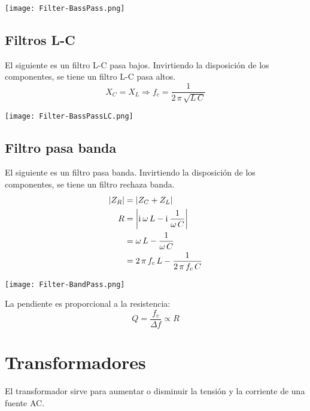\documentclass[a5paper,12pt,twoside]{book}
\begin{document}
\begin{center}
    \texttt{[image: Filter-BassPass.png]}
\end{center}


\subsection*{Filtros L-C}

El siguiente es un filtro L-C pasa bajos. Invirtiendo la disposición de los componentes, se tiene un filtro L-C pasa altos.
\begin{equation*}
    X_C = X_L \Rightarrow f_c = \dfrac{1}{2 \, \pi \, \sqrt{L \, C}}
\end{equation*}

\begin{center}
    \texttt{[image: Filter-BassPassLC.png]}
\end{center}


\subsection*{Filtro pasa banda}

El siguiente es un filtro pasa banda. Invirtiendo la disposición de los componentes, se tiene un filtro rechaza banda.
\begin{align*}
    {\left| {Z_R} \right|} &= {\left| {Z_C + Z_L} \right|}
    \\
    R &= {\left| {\mathrm{i}\mkern1mu \, \omega \, L - \mathrm{i}\mkern1mu \, \frac{1}{\omega \, C}} \right|}
    \\
    &= \omega \, L - \frac{1}{\omega \, C}
    \\
    &= 2 \, \pi \, f_c \, L - \frac{1}{2 \, \pi \, f_c \, C}
\end{align*}

\begin{center}
    \texttt{[image: Filter-BandPass.png]}
\end{center}

La pendiente es proporcional a la resistencia:
\begin{equation*}
    Q = \frac{f_c}{\Delta f} \propto R
\end{equation*}


\section{Transformadores}

El transformador sirve para aumentar o disminuir la tensión y la corriente de una fuente AC.
\end{document}

